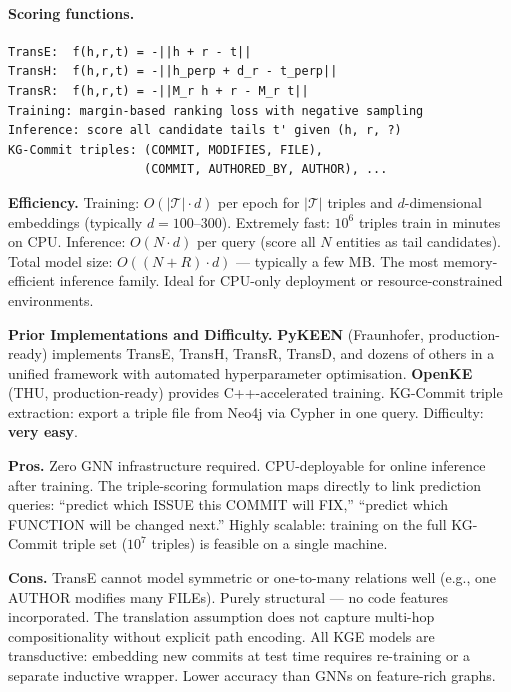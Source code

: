 \documentclass[12pt,a4paper]{article}
\begin{document}
\paragraph{Scoring functions.}
\begin{lstlisting}
TransE:  f(h,r,t) = -||h + r - t||
TransH:  f(h,r,t) = -||h_perp + d_r - t_perp||
TransR:  f(h,r,t) = -||M_r h + r - M_r t||
Training: margin-based ranking loss with negative sampling
Inference: score all candidate tails t' given (h, r, ?)
KG-Commit triples: (COMMIT, MODIFIES, FILE),
                   (COMMIT, AUTHORED_BY, AUTHOR), ...
\end{lstlisting}

\begin{effbox}
\textbf{Efficiency.}
Training: $O(|\mathcal{T}| \cdot d)$ per epoch for $|\mathcal{T}|$ triples
and $d$-dimensional embeddings (typically $d=100$--$300$). Extremely fast:
$10^6$ triples train in minutes on CPU. Inference: $O(N \cdot d)$ per query
(score all $N$ entities as tail candidates). Total model size: $O((N+R) \cdot d)$
--- typically a few MB. The most memory-efficient inference family. Ideal for
CPU-only deployment or resource-constrained environments.
\end{effbox}

\begin{implbox}
\textbf{Prior Implementations and Difficulty.}
\textbf{PyKEEN} (Fraunhofer, production-ready) implements TransE, TransH,
TransR, TransD, and dozens of others in a unified framework with automated
hyperparameter optimisation. \textbf{OpenKE} (THU, production-ready) provides
C++-accelerated training. KG-Commit triple extraction: export a triple file
from Neo4j via Cypher in one query. Difficulty: \textbf{very easy}.
\end{implbox}

\begin{prosbox}
\textbf{Pros.}
Zero GNN infrastructure required. CPU-deployable for online inference after
training. The triple-scoring formulation maps directly to link prediction
queries: ``predict which ISSUE this COMMIT will FIX,'' ``predict which
FUNCTION will be changed next.'' Highly scalable: training on the full
KG-Commit triple set ($10^7$ triples) is feasible on a single machine.
\end{prosbox}

\begin{consbox}
\textbf{Cons.}
TransE cannot model symmetric or one-to-many relations well (e.g., one AUTHOR
modifies many FILEs). Purely structural --- no code features incorporated.
The translation assumption does not capture multi-hop compositionality without
explicit path encoding. All KGE models are transductive: embedding new commits
at test time requires re-training or a separate inductive wrapper. Lower accuracy
than GNNs on feature-rich graphs.
\end{consbox}
\end{document}
